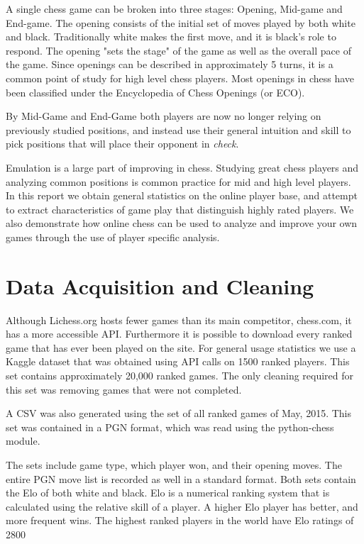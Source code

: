 \documentclass[reprint,
 amsmath,amssymb,nobibnotes,
 aps, floatfix]{revtex4-1}
\begin{document}
A single chess game  can be broken into three stages: Opening, Mid-game and End-game. The opening consists of the initial set of moves played by both white and black. Traditionally white makes the first move, and it is black's role to respond. The opening "sets the stage" of the game as well as the overall pace of the game. Since openings can be described in approximately 5 turns, it is a common point of study for high level chess players. Most openings in chess have been classified under the Encyclopedia of Chess Openings (or ECO). 

By Mid-Game and End-Game both players are now no longer relying on previously studied positions, and instead use their general intuition and skill to pick positions that will place their opponent in \textit{check}. 

Emulation is a large part of improving in chess. Studying great chess players and analyzing common positions is common practice for mid and high level players. In this report we obtain general statistics on the online player base, and attempt to extract characteristics of game play that distinguish highly rated players. We also demonstrate how online chess can be used to analyze and improve your own games through the use of player specific analysis. 

\section{\label{sec:level2}Data Acquisition and Cleaning}
Although Lichess.org hosts fewer games than its main competitor, chess.com, it has a more accessible API. Furthermore it is possible to download every ranked game that has ever been played on the site. For general usage statistics we use a Kaggle dataset that was obtained using API calls on 1500 ranked players. This set contains approximately 20,000 ranked games. The only cleaning required for this set was removing games that were not completed.

A CSV was also generated using the set of all ranked games of May, 2015. This set was contained in a PGN format, which was read using the python-chess module.

The sets include game type, which player won, and their opening moves. The entire PGN move list is recorded as well in a standard format. Both sets contain the Elo of both white and black. Elo is a numerical ranking system that is calculated using the relative skill of a player. A higher Elo player has better, and more frequent wins. The highest ranked players in the world have Elo ratings of 2800 
\end{document}
